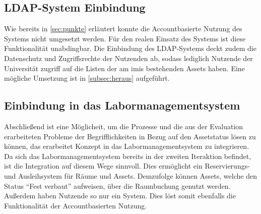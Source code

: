 \subsection{LDAP-System Einbindung}
Wie bereits in \ref{sec:punkte} erläutert konnte die Accountbasierte Nutzung des
Systems nicht umgesetzt werden. Für den realen Einsatz des Systems ist diese
Funktionalität unabdingbar. Die Einbindung des  LDAP-Systems deckt zudem die
Datenschutz und Zugriffsrechte der Nutzenden ab, sodass lediglich Nutzende der
Universität zugriff auf die Listen der am \ac{imis} bestehenden Assets haben.
Eine mögliche Umsetzung ist in \ref{subsec:heraus} aufgeführt.

\subsection{Einbindung in das Labormanagementsystem}
Abschließend ist eine Möglicheit, um die Prozesse und die aus der Evaluation
erarbeiteten Probleme der Begrifflichkeiten in Bezug auf den Assetstatus lösen
zu können, das erarbeitet Konzept in das Labormanagementsystem zu  integrieren. Da sich das Labormanagementsystem bereits in der zweiten
Iteraktion befindet, ist die Integration auf diesem Wege sinnvoll. Dies
ermöglicht ein Reservierungs- und Ausleihsystem für Räume und Assets. Demzufolge
können Assets, welche den Status \enquote{Fest verbaut} aufweisen, über die
Raumbuchung genutzt werden. Außerdem haben Nutzende so nur ein System. Dies löst
somit ebenfalls die Funktionalität der Accountbasierten Nutzung.


